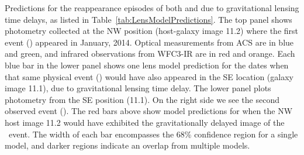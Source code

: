 \label{fig:SpockDelayPredictions}
Predictions for the reappearance episodes of both \spockone
and \spocktwo due to gravitational lensing time delays, as listed in
Table~\ref{tab:LensModelPredictions}.  The top panel shows photometry
collected at the NW position (host-galaxy image 11.2) where the first
event (\spockone) appeared in January, 2014.  Optical
measurements from ACS are in blue and green, and infrared observations
from WFC3-IR are in red and orange.  Each blue bar in the lower panel shows
one lens model prediction for the dates when that same physical event
(\spockone) would have also appeared in the SE location (galaxy image
11.1), due to gravitational lensing time delay.  The lower panel plots
photometry from the SE position (11.1). On the right side we see the
second observed event (\spocktwo).  The red bars above
show model predictions for when the NW host image 11.2 would have
exhibited the gravitationally delayed image of the \spocktwo\ event.
The width of each bar encompasses the 68\% confidence region for a
single model, and darker regions indicate an overlap from multiple
models.
  
